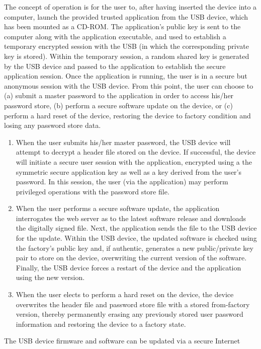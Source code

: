 The concept of operation is for the user to, after having inserted the device into a computer, launch the provided trusted application from the USB device, which has been mounted as a CD-ROM.  The application's public key is sent to the computer along with the application executable, and used to establish a temporary encrypted session with the USB (in which the corresponding private key is stored).  Within the temporary session, a random shared key is generated by the USB device and passed to the application to establish the secure application session.  Once the application is running, the user is in a secure but anonymous session with the USB device.  From this point, the user can choose to (a) submit a master password to the application in order to access his/her password store, (b) perform a secure software update on the device, or (c) perform a hard reset of the device, restoring the device to factory condition and losing any password store data.
\begin{enumerate}
    \item When the user submits his/her master password, the USB device will attempt to decrypt a header file stored on the device.  If successful, the device will initiate a secure user session with the application, encrypted using a the symmetric secure application key as well as a key derived from the user's password.  In this session, the user (via the application) may perform privileged operations with the password store file.
    \item When the user performs a secure software update, the application interrogates the web server as to the latest software release and downloads the digitally signed file.  Next, the application sends the file to the USB device for the update.  Within the USB device, the updated software is checked using the factory's public key and, if authentic, generates a new public/private key pair to store on the device, overwriting the current version of the software.  Finally, the USB device forces a restart of the device and the application using the new version.
    \item When the user elects to perform a hard reset on the device, the device overwrites the header file and password store file with a stored from-factory version, thereby permanently erasing any previously stored user password information and restoring the device to a factory state.
\end{enumerate}
\par The USB device firmware and software can be updated via a secure Internet
